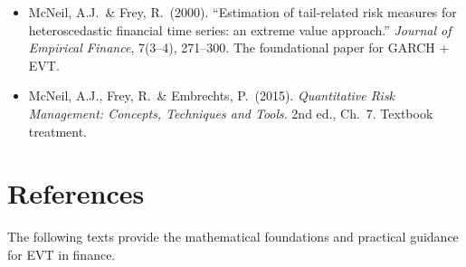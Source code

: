 \documentclass[11pt, a4paper]{article}
\theoremstyle{definition}
\theoremstyle{plain}
\theoremstyle{remark}
\begin{document}
\begin{refbox}
\begin{itemize}
    \item McNeil, A.J.\ \& Frey, R.\ (2000). ``Estimation of tail-related risk measures for
          heteroscedastic financial time series: an extreme value approach.''
          \emph{Journal of Empirical Finance}, 7(3--4), 271--300.
          The foundational paper for GARCH + EVT.
    \item McNeil, A.J., Frey, R.\ \& Embrechts, P.\ (2015).
          \emph{Quantitative Risk Management: Concepts, Techniques and Tools}. 2nd ed., Ch.~7.
          Textbook treatment.
\end{itemize}
\end{refbox}

\section{References}
\label{sec:references}

The following texts provide the mathematical foundations and practical guidance for EVT in finance.
\end{document}
